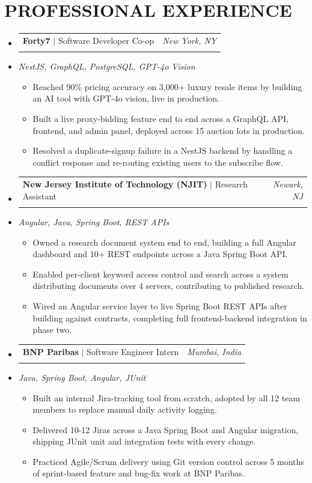 \documentclass[letterpaper,11pt]{article}
\makeatletter
\newcommand{\resumeItem}[1]{
  \item\small{#1\vspace{-3pt}}
}
\newcommand{\resumeStack}[1]{
  \vspace{1pt}\item\small{\textit{#1}}\vspace{-6pt}
}
\newcommand{\resumeExpHeading}[4]{
  \vspace{-3pt}\item
    \begin{tabular*}{1.0\textwidth}[t]{l@{\extracolsep{\fill}}r}
      \textbf{\large #1} $|$ #2 & \textit{\large #3} \\
       & \text{\small #4} \\
    \end{tabular*}\vspace{-9pt}
}
\newcommand{\resumeItemListStart}{\begin{itemize}[leftmargin=0.15in, label=$\bullet$]}
\newcommand{\resumeItemListEnd}{\end{itemize}\vspace{-7pt}}
\newcommand{\resumeSubHeadingListStart}{\begin{itemize}[leftmargin=0.0in, label={}]}
\newcommand{\resumeSubHeadingListEnd}{\end{itemize}}
\makeatother
\begin{document}
\section{PROFESSIONAL EXPERIENCE}
\resumeSubHeadingListStart
\vspace{10pt}
\resumeExpHeading
{Forty7}{Software Developer Co-op}{New York, NY}{Jan 2026 -- May 2026}
\vspace{-13pt}
\resumeStack{NestJS, GraphQL, PostgreSQL, GPT-4o Vision}
\resumeItemListStart
  \resumeItem{Reached 90\% pricing accuracy on 3,000+ luxury resale items by building an AI tool with GPT-4o vision, live in production.}
  \resumeItem{Built a live proxy-bidding feature end to end across a GraphQL API, frontend, and admin panel, deployed across 15 auction lots in production.}
  \resumeItem{Resolved a duplicate-signup failure in a NestJS backend by handling a conflict response and re-routing existing users to the subscribe flow.}
\resumeItemListEnd
\vspace{10pt}
\resumeExpHeading
{New Jersey Institute of Technology (NJIT)}{Research Assistant}{Newark, NJ}{Apr 2025 -- Sep 2025}
\vspace{-13pt}
\resumeStack{Angular, Java, Spring Boot, REST APIs}
\resumeItemListStart
  \resumeItem{Owned a research document system end to end, building a full Angular dashboard and 10+ REST endpoints across a Java Spring Boot API.}
  \resumeItem{Enabled per-client keyword access control and search across a system distributing documents over 4 servers, contributing to published research.}
  \resumeItem{Wired an Angular service layer to live Spring Boot REST APIs after building against contracts, completing full frontend-backend integration in phase two.}
\resumeItemListEnd
\vspace{10pt}
\resumeExpHeading
{BNP Paribas}{Software Engineer Intern}{Mumbai, India}{Jan 2024 -- Jul 2024}
\vspace{-13pt}
\resumeStack{Java, Spring Boot, Angular, JUnit}
\resumeItemListStart
  \resumeItem{Built an internal Jira-tracking tool from scratch, adopted by all 12 team members to replace manual daily activity logging.}
  \resumeItem{Delivered 10-12 Jiras across a Java Spring Boot and Angular migration, shipping JUnit unit and integration tests with every change.}
  \resumeItem{Practiced Agile/Scrum delivery using Git version control across 5 months of sprint-based feature and bug-fix work at BNP Paribas.}
\resumeItemListEnd

\resumeSubHeadingListEnd

\vspace{-3pt}
\end{document}
